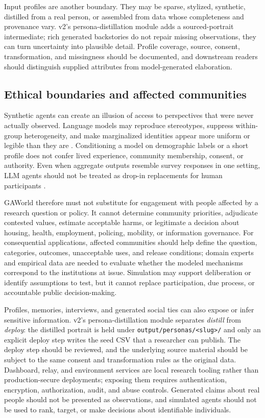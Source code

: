 Input profiles are another boundary.  They may be sparse, stylized,
synthetic, distilled from a real person, or assembled from data whose
completeness and provenance vary.  v2's persona-distillation module
adds a sourced-portrait intermediate; rich generated backstories do
not repair missing observations, they can turn uncertainty into
plausible detail.  Profile coverage, source, consent, transformation,
and missingness should be documented, and downstream readers should
distinguish supplied attributes from model-generated elaboration.

\subsection{Ethical boundaries and affected communities}

Synthetic agents can create an illusion of access to perspectives that
were never actually observed.  Language models may reproduce
stereotypes, suppress within-group heterogeneity, and make
marginalized identities appear more uniform or legible than they are
\citep{wang2025flatten}.  Conditioning a model on demographic labels or
a short profile does not confer lived experience, community
membership, consent, or authority.  Even when aggregate outputs
resemble survey responses in one setting, LLM agents should not be
treated as drop-in replacements for human participants
\citep{dillion2023replace}.

GAWorld therefore must not substitute for engagement with people
affected by a research question or policy.  It cannot determine
community priorities, adjudicate contested values, estimate
acceptable harms, or legitimate a decision about housing, health,
employment, policing, mobility, or information governance.  For
consequential applications, affected communities should help define
the question, categories, outcomes, unacceptable uses, and release
conditions; domain experts and empirical data are needed to evaluate
whether the modeled mechanisms correspond to the institutions at
issue.  Simulation may support deliberation or identify assumptions to
test, but it cannot replace participation, due process, or
accountable public decision-making.

Profiles, memories, interviews, and generated social ties can also
expose or infer sensitive information.  v2's persona-distillation
module separates \emph{distill} from \emph{deploy}: the distilled
portrait is held under \texttt{output/personas/<slug>/} and only an
explicit deploy step writes the seed CSV that a researcher can
publish.  The deploy step should be reviewed, and the underlying
source material should be subject to the same consent and
transformation rules as the original data.  Dashboard, relay, and
environment services are local research tooling rather than
production-secure deployments; exposing them requires authentication,
encryption, authorization, audit, and abuse controls.  Generated
claims about real people should not be presented as observations, and
simulated agents should not be used to rank, target, or make
decisions about identifiable individuals.

